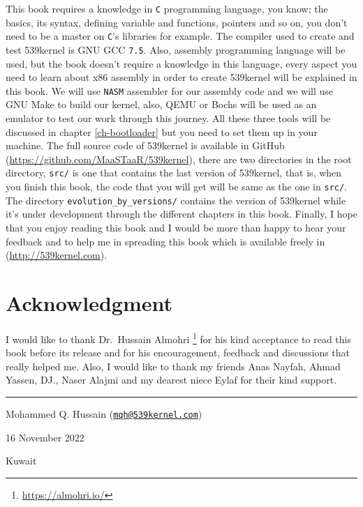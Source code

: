 This book requires a knowledge in \lstinline!C! programming language,
you know; the basics, its syntax, defining variable and functions,
pointers and so on, you don't need to be a master on \lstinline!C!'s
libraries for example. The compiler used to create and test 539kernel is
GNU GCC \lstinline!7.5!. Also, assembly programming language will be
used, but the book doesn't require a knowledge in this language, every
aspect you need to learn about x86 assembly in order to create 539kernel
will be explained in this book. We will use \lstinline!NASM! assembler
for our assembly code and we will use GNU Make to build our kernel,
also, QEMU or Bochs will be used as an emulator to test our work through
this journey. All these three tools will be discussed in chapter
\ref{ch-bootloader} but you need to set them up in your machine. The
full source code of 539kernel is available in GitHub
(\url{https://github.com/MaaSTaaR/539kernel}), there are two directories
in the root directory, \lstinline!src/! is one that contains the last
version of 539kernel, that is, when you finish this book, the code that
you will get will be same as the one in \lstinline!src/!. The directory
\lstinline!evolution_by_versions/! contains the version of 539kernel
while it's under development through the different chapters in this
book. Finally, I hope that you enjoy reading this book and I would be
more than happy to hear your feedback and to help me in spreading this
book which is available freely in (\url{http://539kernel.com}).

\section*{Acknowledgment}\label{acknowledgment}

I would like to thank Dr.~Hussain Almohri \footnote{\url{https://almohri.io/}}
for his kind acceptance to read this book before its release and for his
encouragement, feedback and discussions that really helped me. Also, I
would like to thank my friends Anas Nayfah, Ahmad Yassen, DJ., Naser
Alajmi and my dearest niece Eylaf for their kind support.

\begin{center}\rule{0.5\linewidth}{\linethickness}\end{center}

Mohammed Q. Hussain
(\href{mailto:mqh@539kernel.com}{\nolinkurl{mqh@539kernel.com}})

16 November 2022

Kuwait
